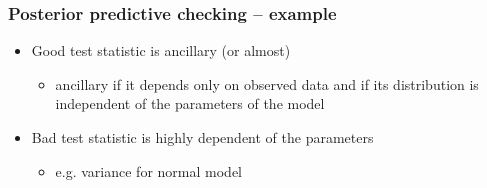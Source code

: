 \documentclass[10pt,handout]{beamer}
\begin{document}
\begin{frame}[fragile]

\frametitle{Posterior predictive checking -- example}

  \begin{itemize}
  \item<1-> Good test statistic is ancillary (or almost)
    \begin{itemize}
    \item ancillary if it depends only on observed data and if its
      distribution is independent of the parameters of the model
    \end{itemize}
  \item<2-> Bad test statistic is highly dependent of the parameters
    \begin{itemize}
    \item e.g. variance for normal model
    \end{itemize}
  \end{itemize}
  \vspace{-1.5\baselineskip}

\end{frame}
\end{document}
